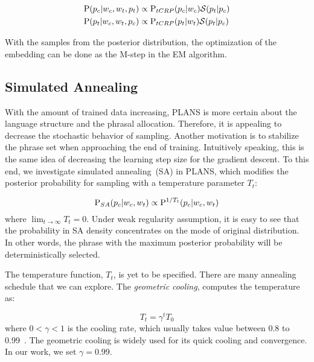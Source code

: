 \begin{align}
  \P(p_c | w_c, w_t, p_t) &\propto \P_{tCRP}(p_c | w_c)  \mathcal{S}(p_t | p_c)
    \\
  \P(p_t | w_c, w_t, p_c) &\propto \P_{tCRP}(p_t | w_t)  \mathcal{S}(p_t | p_c)
\end{align}

With the samples from the posterior distribution, the optimization of the
embedding can be done as the M-step in the EM algorithm.

\subsection{Simulated Annealing}

With the amount of trained data increasing, PLANS is more certain about the
language structure and the phrasal allocation. Therefore, it is appealing to
decrease the stochastic behavior of sampling. Another motivation is to stabilize
the phrase set when approaching the end of training. Intuitively speaking, this
is the same idea of decreasing the learning step size for the gradient descent.
To this end, we investigate simulated annealing~(SA) in PLANS, which modifies
the posterior probability for sampling with a temperature parameter $T_t$:

\begin{equation}
  \P_{SA}(p_c | w_c, w_t) \propto \P^{1/T_t}(p_c | w_c, w_t)
\end{equation}
%
where $\lim_{t\rightarrow \infty} T_t = 0$. Under weak regularity assumption, it
is easy to see that the probability in SA density concentrates on the mode of
original distribution. In other words, the phrase with the maximum posterior
probability will be deterministically selected.

The temperature function, $T_t$, is yet to be specified. There are many
annealing schedule that we can explore. The \emph{geometric cooling}, computes
the temperature as:

\begin{equation}
  T_t = \gamma^t T_0
\end{equation}
%
where $0 < \gamma < 1$ is the cooling rate, which usually takes value between
0.8 to 0.99~\cite{yuan2004annealed}. The geometric cooling is widely used for
its quick cooling and convergence. In our work, we set $\gamma = 0.99$.




